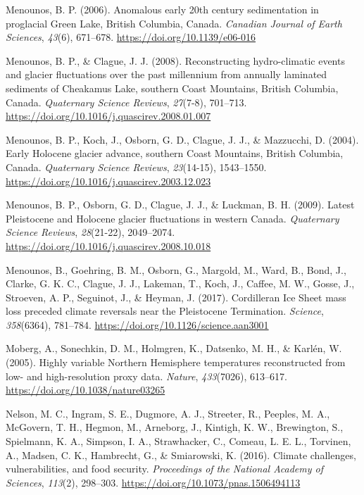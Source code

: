 \documentclass[
  letterpaper,
  DIV=11,
  numbers=noendperiod]{scrartcl}
\newlength{\cslhangindent}
\newenvironment{CSLReferences}[2] %
 {\begin{list}{}{%
  \setlength{\itemindent}{0pt}
  \setlength{\leftmargin}{0pt}
  \setlength{\parsep}{0pt}
  \ifodd #1
   \setlength{\leftmargin}{\cslhangindent}
   \setlength{\itemindent}{-1\cslhangindent}
  \fi
  \setlength{\itemsep}{#2\baselineskip}}}
 {\end{list}}
\begin{document}
\begin{CSLReferences}{1}{0}
Menounos, B. P. (2006). {Anomalous early 20th century sedimentation in
proglacial Green Lake, British Columbia, Canada}. \emph{Canadian Journal
of Earth Sciences}, \emph{43}(6), 671--678.
\url{https://doi.org/10.1139/e06-016}

Menounos, B. P., \& Clague, J. J. (2008). {Reconstructing hydro-climatic
events and glacier fluctuations over the past millennium from annually
laminated sediments of Cheakamus Lake, southern Coast Mountains, British
Columbia, Canada}. \emph{Quaternary Science Reviews}, \emph{27}(7-8),
701--713. \url{https://doi.org/10.1016/j.quascirev.2008.01.007}

Menounos, B. P., Koch, J., Osborn, G. D., Clague, J. J., \& Mazzucchi,
D. (2004). {Early Holocene glacier advance, southern Coast Mountains,
British Columbia, Canada}. \emph{Quaternary Science Reviews},
\emph{23}(14-15), 1543--1550.
\url{https://doi.org/10.1016/j.quascirev.2003.12.023}

Menounos, B. P., Osborn, G. D., Clague, J. J., \& Luckman, B. H. (2009).
{Latest Pleistocene and Holocene glacier fluctuations in western
Canada}. \emph{Quaternary Science Reviews}, \emph{28}(21-22),
2049--2074. \url{https://doi.org/10.1016/j.quascirev.2008.10.018}

Menounos, B., Goehring, B. M., Osborn, G., Margold, M., Ward, B., Bond,
J., Clarke, G. K. C., Clague, J. J., Lakeman, T., Koch, J., Caffee, M.
W., Gosse, J., Stroeven, A. P., Seguinot, J., \& Heyman, J. (2017).
{Cordilleran Ice Sheet mass loss preceded climate reversals near the
Pleistocene Termination}. \emph{Science}, \emph{358}(6364), 781--784.
\url{https://doi.org/10.1126/science.aan3001}

Moberg, A., Sonechkin, D. M., Holmgren, K., Datsenko, M. H., \& Karlén,
W. (2005). {Highly variable Northern Hemisphere temperatures
reconstructed from low- and high-resolution proxy data}. \emph{Nature},
\emph{433}(7026), 613--617. \url{https://doi.org/10.1038/nature03265}

Nelson, M. C., Ingram, S. E., Dugmore, A. J., Streeter, R., Peeples, M.
A., McGovern, T. H., Hegmon, M., Arneborg, J., Kintigh, K. W.,
Brewington, S., Spielmann, K. A., Simpson, I. A., Strawhacker, C.,
Comeau, L. E. L., Torvinen, A., Madsen, C. K., Hambrecht, G., \&
Smiarowski, K. (2016). {Climate challenges, vulnerabilities, and food
security}. \emph{Proceedings of the National Academy of Sciences},
\emph{113}(2), 298--303. \url{https://doi.org/10.1073/pnas.1506494113}


\end{CSLReferences}
\end{document}
